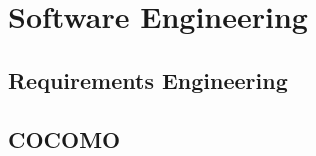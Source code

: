\section{Software Engineering}{

	\subsection{Requirements Engineering}
	
	
	\subsection{COCOMO}
	
}